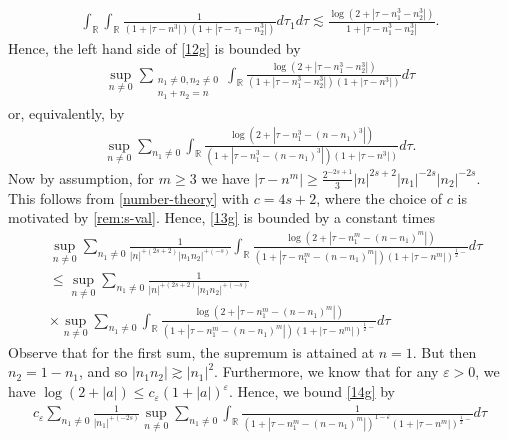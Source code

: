 \documentclass[12pt,reqno]{amsart}
\numberwithin{equation}{section}  %
\numberwithin{figure}{section}
\newcommand{\rr}{\mathbb{R}}
\newcommand{\ee}{\varepsilon}
\theoremstyle{plain}
\theoremstyle{definition}
\theoremstyle{remark}
\begin{document}
%
%
\begin{equation*}
	\begin{split}
	\int_{\rr}
		\int_\rr  \frac{1}{(1 + | \tau - n^{3} |)(1 + | \tau - \tau_1 -
		n_2^3 |)} d \tau_1 d \tau \lesssim \frac{\log(2 + | \tau - n_{1}^{3} -
		n_{2}^{3} |)}{1 + | \tau - n_{1}^{3} - n_{2}^{3} |}.
	\end{split}
\end{equation*}
%
%
%
Hence, the left hand side of \eqref{12g} is bounded by
%
\begin{equation*}
	\begin{split}
		\sup_{n \neq 0} \sum_{\substack{n_1 \neq 0, n_2 \neq 0 \\n_1 +n_2 =n}}
		\int_{\rr} \frac{\log(2 + | \tau - n_{1}^{3} -
		n_{2}^{3} |)}{(1 + | \tau - n_{1}^{3} - n_{2}^{3} |)(1 + | \tau - n^{3} |)}
		d \tau	
	\end{split}
\end{equation*}
%
%
or, equivalently, by
%
%
\begin{equation}
	\label{13g}
	\begin{split}
		\sup_{n \neq 0} \sum_{n_1 \neq 0} \int_{\rr} \frac{\log(2 + | \tau -
		n_{1}^{3} - (n - n_1)^{3} |)}{(1 + | \tau - n_{1}^{3} - (n - n_{1})^{3} |)(1
		+ | \tau - n^{3} |)} d \tau.
	\end{split}
\end{equation}
%
%
Now by assumption, for $m \ge 3$
we have  $ |\tau - n^m| \ge
\frac{2^{-2s+1}}{3} | n |^{2s+2} | n_{1} |^{-2s}| n_2
|^{-2s}$. This follows from  \eqref{number-theory}
with $c = 4s+2$, where the choice of $c$ is motivated by \autoref{rem:s-val}. Hence, \eqref{13g} is bounded by a constant times
%
%
%
%
\begin{equation}
	\label{14g}
	\begin{split}
		& \sup_{n \neq 0} \sum_{n_1 \neq 0}
		\frac{1}{|n|^{+(2s +2)}{|n_1 n_2 |^{+(-s)}}}\int_{\rr} \frac{\log(2 + | \tau
		- n_{1}^m - (n - n_1)^m |)}{(1 + | \tau - n_{1}^m - (n - n_{1})^m
		|)(1 + | \tau - n^m |)^{\frac{1}{2}-}}
		d \tau
		\\
		& \le \sup_{n \neq 0} \sum_{n_1 \neq 0}
		\frac{1}{|n|^{+(2s +2)}{|n_1 n_2 |^{+(-s)}}}		\\
		& \times \sup_{n \neq 0} \sum_{n_1 \neq 0}
		\int_{\rr} \frac{\log(2 + | \tau
		- n_{1}^m - (n - n_1)^m |)}{(1 + | \tau - n_{1}^m - (n - n_{1})^m
		|)(1 + | \tau - n^m |)^{\frac{1}{2}-}}
		d \tau
	\end{split}
\end{equation}
%
%
Observe that for the first sum, the supremum is attained at $n=1$. But then $n_2
= 1 - n_1$, and so $| n_1 n_2 | \gtrsim | n_1 |^2$. Furthermore, we know that 
for any $\ee > 0$, we have $\log (2 + | a |) \le c_{\ee}(1 + | a
|)^{\ee}$. Hence, we bound \eqref{14g} by
%
%
%
%
\begin{equation*}
	\begin{split}
		c_{\ee}  \sum_{n_1 \neq 0} \frac{1}{|n_1|^{+(-2s)}}
		\sup_{n \neq 0} \sum_{n_1 \neq 0} \int_{\rr} \frac{1}{(1 +
		| \tau - n_{1}^m - (n - n_{1})^m |)^{1- \ee}(1 + | \tau - n^m
		|)^{\frac{1}{2}-}} d \tau
	\end{split}
\end{equation*}
\end{document}
